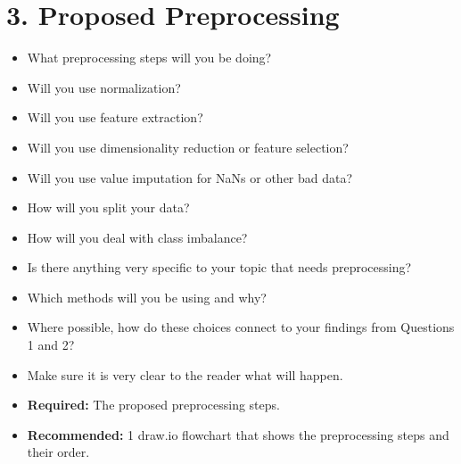 \documentclass[11pt]{article}
\begin{document}
\section{3. Proposed Preprocessing}
\begin{itemize}
    \item What preprocessing steps will you be doing?
    \item Will you use normalization?
    \item Will you use feature extraction?
    \item Will you use dimensionality reduction or feature selection?
    \item Will you use value imputation for NaNs or other bad data?
    \item How will you split your data?
    \item How will you deal with class imbalance?
    \item Is there anything very specific to your topic that needs preprocessing?
    \item Which methods will you be using and why?
    \item Where possible, how do these choices connect to your findings from Questions 1 and 2?
    \item Make sure it is very clear to the reader what will happen.
    \item \textbf{Required:} The proposed preprocessing steps.
    \item \textbf{Recommended:} 1 draw.io flowchart that shows the preprocessing steps and their order.
\end{itemize}
\end{document}
